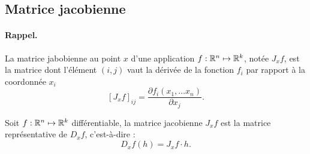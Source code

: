 \subsection{Matrice jacobienne} 

\paragraph*{Rappel.} La matrice jabobienne au point $x$ d'une application $f : \mathbb{R}^n \mapsto \mathbb{R}^k$, notée $J_xf$, est la matrice dont l'élément $(i, j)$ vaut la dérivée de la fonction $f_i$ par rapport à la coordonnée $x_i$
$$
[J_xf]_{ij} = \frac{\partial f_i(x_1, \dots x_n)}{\partial x_j}.
$$

\begin{proposition} \label{prop:matriceJacobienne}
  Soit $f : \mathbb{R}^n \mapsto \mathbb{R}^k$ différentiable, la matrice jacobienne $J_xf$ est la matrice représentative de $D_xf$, c'est-à-dire :
  $$
  D_xf(h) = J_xf \cdot h.
  $$
\end{proposition}


